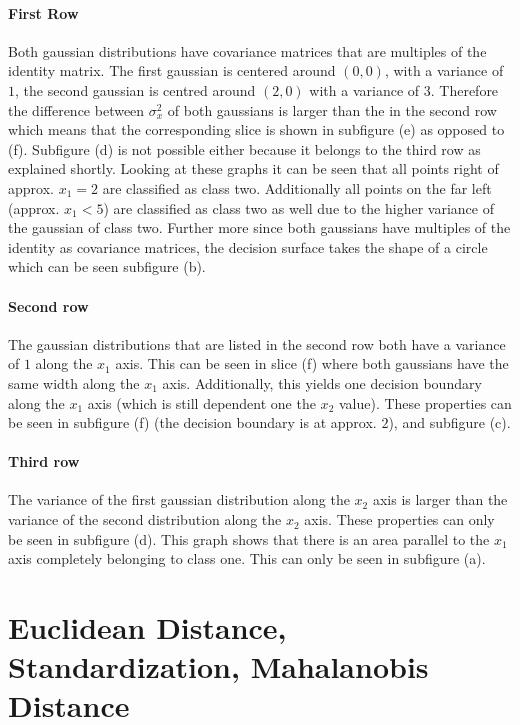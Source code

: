 \documentclass[DIN, pagenumber=false, fontsize=11pt, parskip=half]{scrartcl}
\begin{document}
    \paragraph{First Row}
    Both gaussian distributions have covariance matrices that are multiples of the identity matrix. 
    The first gaussian is centered around $(0,0)$, with a variance of $1$, the second gaussian is centred around $(2,0)$ with a variance of $3$.
    Therefore the difference between $\sigma_x^2$ of both gaussians is larger than the in the second row which means that the corresponding slice
    is shown in subfigure (e) as opposed to (f). Subfigure (d) is not possible either because it belongs to the third row as explained shortly.
    Looking at these graphs it can be seen that all points right of approx. $x_1 = 2$ are classified as class two.
    Additionally all points on the far left (approx. $x_1 < 5$) are classified as class two as well due to the higher variance of the gaussian of class two.
    Further more since both gaussians have multiples of the identity as covariance matrices, the decision surface takes the shape of a circle which can be seen
    subfigure (b).

    \paragraph{Second row}
    The gaussian distributions that are listed in the second row both have a variance of $1$ along the $x_1$ axis. This can be seen in slice (f) where both
    gaussians have the same width along the $x_1$ axis.
    Additionally, this yields one decision boundary along the $x_1$ axis (which is still dependent one the $x_2$ value).
    These properties can be seen in subfigure (f) (the decision boundary is at approx. $2$), and subfigure (c).

    \paragraph{Third row}
    The variance of the first gaussian distribution along the $x_2$ axis is larger than the variance of the second distribution along the $x_2$ axis.
    These properties can only be seen in subfigure (d). This graph shows that there is an area parallel to the $x_1$ axis completely belonging to class one.
    This can only be seen in subfigure (a).

    \section{Euclidean Distance, Standardization, Mahalanobis Distance}
\end{document}
